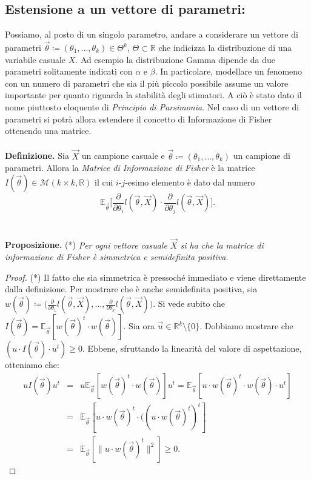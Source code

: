 \subsection{Estensione a un vettore di parametri:}
Possiamo, al posto di un singolo parametro, andare a considerare un vettore di parametri $\vec{\theta}\coloneqq (\theta_1,\ldots,\theta_k)\in \Theta^k$, $\Theta\subset\mathbb{R}$ che indicizza la distribuzione di una variabile casuale $X$. Ad esempio la distribuzione Gamma dipende da due parametri solitamente indicati con $\alpha$ e $\beta$. In particolare, modellare un fenomeno con un numero di parametri che sia il più piccolo possibile assume un valore importante per quanto riguarda la stabilità degli stimatori. A ciò è stato dato il nome piuttosto eloquente di \textit{Principio di Parsimonia}. Nel caso di un vettore di parametri si potrà allora estendere il concetto di Informazione di Fisher ottenendo una matrice.
\\
\\
\textbf{Definizione.} Sia $\vec{X}$ un campione casuale e $\vec{\theta}\coloneqq (\theta_1,\ldots,\theta_k)$ un campione di parametri. Allora la \textit{Matrice di Informazione di Fisher} è la matrice $I(\vec{\theta})\in \mathcal{M}(k\times k, \mathbb{R})$ il cui $i$-$j$-esimo elemento è dato dal numero $$\mathbb{E}_{\vec{\theta}}\Big[\frac{\partial}{\partial\theta_i}l(\vec{\theta},\vec{X})\cdot \frac{\partial}{\partial\theta_j}l(\vec{\theta},\vec{X})\Big].$$
\\
\\
\textbf{Proposizione.} (*) \textit{Per ogni vettore casuale $\vec{X}$ si ha che la matrice di informazione di Fisher è simmetrica e semidefinita positiva.}
\begin{proof}(*)
Il fatto che sia simmetrica è pressoché immediato e viene direttamente dalla definizione. Per mostrare che è anche semidefinita positiva, sia $w(\vec{\theta})\coloneqq \big(\frac{\partial}{\partial\theta_1}l(\vec{\theta},\vec{X}), \ldots, \frac{\partial}{\partial\theta_k}l(\vec{\theta},\vec{X})\big)$. Si vede subito che $I(\vec{\theta})=\mathbb{E}_{\vec{\theta}}[w(\vec{\theta})^t\cdot w(\vec{\theta})].$ Sia ora $\vec{u}\in \mathbb{R}^k\setminus\{0\}$. Dobbiamo mostrare che $(u\cdot I(\vec{\theta})\cdot u^t)\geq 0$. Ebbene, sfruttando la linearità del valore di aspettazione, otteniamo che: 
\begin{eqnarray*}
u I(\vec{\theta})u^t&=& u \mathbb{E}_{\vec{\theta}}[w(\vec{\theta})^t\cdot w(\vec{\theta})] u^t=\mathbb{E}_{\vec{\theta}}[u\cdot w(\vec{\theta})^t\cdot w(\vec{\theta})\cdot u^t] \\
&=& \mathbb{E}_{\vec{\theta}}[u\cdot w(\vec{\theta})^t\cdot ((u\cdot w(\vec{\theta})^t)^t] \\
&=& \mathbb{E}_{\vec{\theta}}[\|u\cdot w(\vec{\theta})^t\|^2]\geq 0.
\end{eqnarray*}
\end{proof}
